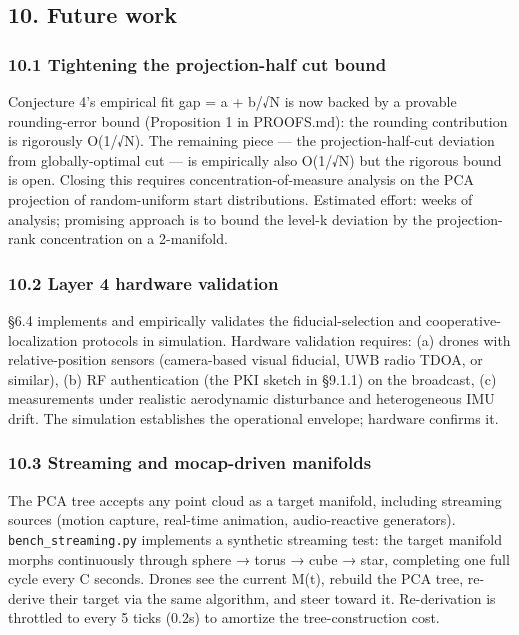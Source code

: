 \subsection{10. Future work}\label{future-work}

\subsubsection{10.1 Tightening the projection-half cut
bound}\label{tightening-the-projection-half-cut-bound}

Conjecture 4's empirical fit gap = a + b/√N is now backed by a provable
rounding-error bound (Proposition 1 in PROOFS.md): the rounding
contribution is rigorously O(1/√N). The remaining piece --- the
projection-half-cut deviation from globally-optimal cut --- is
empirically also O(1/√N) but the rigorous bound is open. Closing this
requires concentration-of-measure analysis on the PCA projection of
random-uniform start distributions. Estimated effort: weeks of analysis;
promising approach is to bound the level-k deviation by the
projection-rank concentration on a 2-manifold.

\subsubsection{10.2 Layer 4 hardware
validation}\label{layer-4-hardware-validation}

§6.4 implements and empirically validates the fiducial-selection and
cooperative-localization protocols in simulation. Hardware validation
requires: (a) drones with relative-position sensors (camera-based visual
fiducial, UWB radio TDOA, or similar), (b) RF authentication (the PKI
sketch in §9.1.1) on the broadcast, (c) measurements under realistic
aerodynamic disturbance and heterogeneous IMU drift. The simulation
establishes the operational envelope; hardware confirms it.

\subsubsection{10.3 Streaming and mocap-driven
manifolds}\label{streaming-and-mocap-driven-manifolds}

The PCA tree accepts any point cloud as a target manifold, including
streaming sources (motion capture, real-time animation, audio-reactive
generators). \texttt{bench\_streaming.py} implements a synthetic
streaming test: the target manifold morphs continuously through sphere →
torus → cube → star, completing one full cycle every C seconds. Drones
see the current M(t), rebuild the PCA tree, re-derive their target via
the same algorithm, and steer toward it. Re-derivation is throttled to
every 5 ticks (0.2s) to amortize the tree-construction cost.

